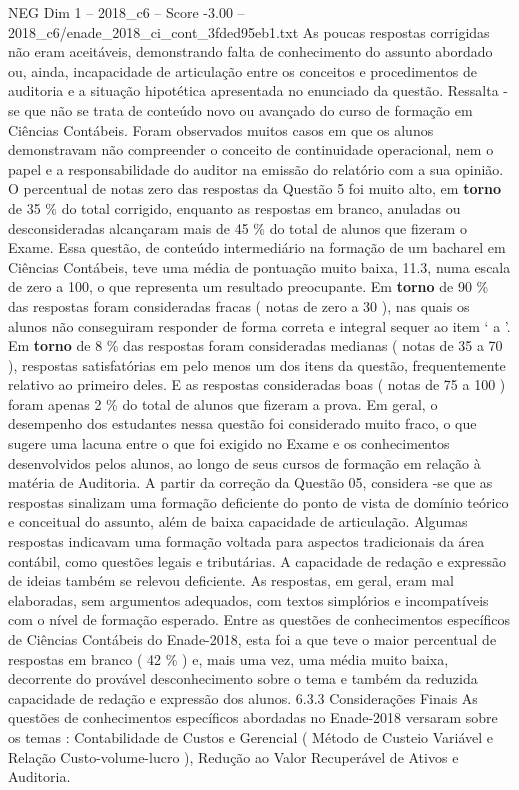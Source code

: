 \begin{textsample}{NEG Dim 1 – 2018\_c6 – Score -3.00 – 2018\_c6/enade\_2018\_ci\_cont\_3fded95eb1.txt}
As poucas respostas corrigidas não eram aceitáveis, demonstrando falta de conhecimento do assunto abordado ou, ainda, incapacidade de articulação entre os conceitos e procedimentos de auditoria e a situação hipotética apresentada no enunciado da questão.
Ressalta -se que não se trata de conteúdo novo ou avançado do curso de formação em Ciências Contábeis.
Foram observados muitos casos em que os alunos demonstravam não compreender o conceito de continuidade operacional, nem o papel e a responsabilidade do auditor na emissão do relatório com a sua opinião.
O percentual de notas zero das respostas da Questão 5 foi muito alto, em \textbf{torno} de 35 \% do total corrigido, enquanto as respostas em branco, anuladas ou desconsideradas alcançaram mais de 45 \% do total de alunos que fizeram o Exame.
Essa questão, de conteúdo intermediário na formação de um bacharel em Ciências Contábeis, teve uma média de pontuação muito baixa, 11.3, numa escala de zero a 100, o que representa um resultado preocupante.
Em \textbf{torno} de 90 \% das respostas foram consideradas fracas ( notas de zero a 30 ), nas quais os alunos não conseguiram responder de forma correta e integral sequer ao item ‘ a ’.
Em \textbf{torno} de 8 \% das respostas foram consideradas medianas ( notas de 35 a 70 ), respostas satisfatórias em pelo menos um dos itens da questão, frequentemente relativo ao primeiro deles.
E as respostas consideradas boas ( notas de 75 a 100 ) foram apenas 2 \% do total de alunos que fizeram a prova.
Em geral, o desempenho dos estudantes nessa questão foi considerado muito fraco, o que sugere uma lacuna entre o que foi exigido no Exame e os conhecimentos desenvolvidos pelos alunos, ao longo de seus cursos de formação em relação à matéria de Auditoria.
A partir da correção da Questão 05, considera -se que as respostas sinalizam uma formação deficiente do ponto de vista de domínio teórico e conceitual do assunto, além de baixa capacidade de articulação.
Algumas respostas indicavam uma formação voltada para aspectos tradicionais da área contábil, como questões legais e tributárias.
A capacidade de redação e expressão de ideias também se relevou deficiente.
As respostas, em geral, eram mal elaboradas, sem argumentos adequados, com textos simplórios e incompatíveis com o nível de formação esperado.
Entre as questões de conhecimentos específicos de Ciências Contábeis do Enade-2018, esta foi a que teve o maior percentual de respostas em branco ( 42 \% ) e, mais uma vez, uma média muito baixa, decorrente do provável desconhecimento sobre o tema e também da reduzida capacidade de redação e expressão dos alunos. 6.3.3 Considerações Finais As questões de conhecimentos específicos abordadas no Enade-2018 versaram sobre os temas : Contabilidade de Custos e Gerencial ( Método de Custeio Variável e Relação Custo-volume-lucro ), Redução ao Valor Recuperável de Ativos e Auditoria.

\end{textsample}
